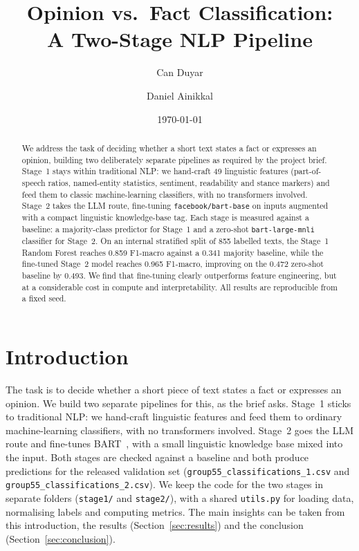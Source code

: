 \documentclass[12pt,a4paper,twocolumn]{article}
\title{Opinion vs.\ Fact Classification:\\ A Two-Stage NLP Pipeline}
\author[1]{Can Duyar}
\author[1]{Daniel Ainikkal}
\affil[1]{Graz University of Technology, Graz, Austria --- Group 55}
\date{\today}
\begin{document}
\maketitle

\begin{abstract}
We address the task of deciding whether a short text states a fact or expresses
an opinion, building two deliberately separate pipelines as required by the
project brief. Stage~1 stays within traditional NLP: we hand-craft 49 linguistic
features (part-of-speech ratios, named-entity statistics, sentiment, readability
and stance markers) and feed them to classic machine-learning classifiers, with
no transformers involved. Stage~2 takes the LLM route, fine-tuning
\texttt{facebook/bart-base} on inputs augmented with a compact linguistic
knowledge-base tag. Each stage is measured against a baseline: a majority-class
predictor for Stage~1 and a zero-shot \texttt{bart-large-mnli} classifier for
Stage~2. On an internal stratified split of 855 labelled texts, the Stage~1
Random Forest reaches \num{0.859} F1-macro against a \num{0.341} majority
baseline, while the fine-tuned Stage~2 model reaches \num{0.965} F1-macro,
improving on the \num{0.472} zero-shot baseline by \num{0.493}. We find that
fine-tuning clearly outperforms feature engineering, but at a considerable cost
in compute and interpretability. All results are reproducible from a fixed seed.
\end{abstract}

\section{Introduction}
\label{sec:intro}
The task is to decide whether a short piece of text states a fact or expresses an
opinion. We build two separate pipelines for this, as the brief asks. Stage~1
sticks to traditional NLP: we hand-craft linguistic features and feed them to
ordinary machine-learning classifiers, with no transformers involved. Stage~2
goes the LLM route and fine-tunes BART~\citep{lewis2020bart}, with a small
linguistic knowledge base mixed into the input. Both stages are checked against a
baseline and both produce predictions for the released validation set
(\texttt{group55\_classifications\_1.csv} and
\texttt{group55\_classifications\_2.csv}). We keep the code for the two stages in
separate folders (\texttt{stage1/} and \texttt{stage2/}), with a shared
\texttt{utils.py} for loading data, normalising labels and computing metrics.
The main insights can be taken from this introduction, the results
(Section~\ref{sec:results}) and the conclusion (Section~\ref{sec:conclusion}).
\end{document}
